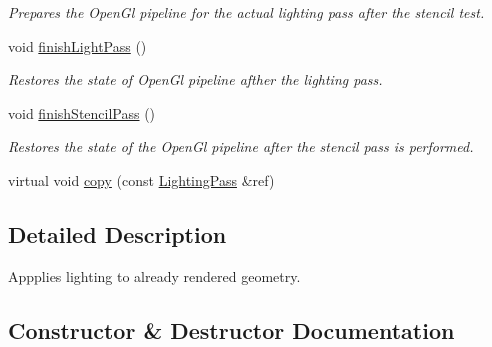 \begin{DoxyCompactItemize}
\begin{DoxyCompactList}\small\item\em Prepares the Open\+Gl pipeline for the actual lighting pass after the stencil test. \end{DoxyCompactList}\item 
\mbox{\label{class_geometry_engine_1_1_geometry_render_step_1_1_lighting_pass_a6d5e908865443b942b83362bf2d8a081}} 
void \mbox{\hyperlink{class_geometry_engine_1_1_geometry_render_step_1_1_lighting_pass_a6d5e908865443b942b83362bf2d8a081}{finish\+Light\+Pass}} ()
\begin{DoxyCompactList}\small\item\em Restores the state of Open\+Gl pipeline afther the lighting pass. \end{DoxyCompactList}\item 
\mbox{\label{class_geometry_engine_1_1_geometry_render_step_1_1_lighting_pass_aa809dc069c363993224df44cf44842bb}} 
void \mbox{\hyperlink{class_geometry_engine_1_1_geometry_render_step_1_1_lighting_pass_aa809dc069c363993224df44cf44842bb}{finish\+Stencil\+Pass}} ()
\begin{DoxyCompactList}\small\item\em Restores the state of the Open\+Gl pipeline after the stencil pass is performed. \end{DoxyCompactList}\item 
virtual void \mbox{\hyperlink{class_geometry_engine_1_1_geometry_render_step_1_1_lighting_pass_a4865616b03a872033a6f9abc5c370374}{copy}} (const \mbox{\hyperlink{class_geometry_engine_1_1_geometry_render_step_1_1_lighting_pass}{Lighting\+Pass}} \&ref)
\end{DoxyCompactItemize}


\subsection{Detailed Description}
Appplies lighting to already rendered geometry. 

\subsection{Constructor \& Destructor Documentation}
\mbox{\label{class_geometry_engine_1_1_geometry_render_step_1_1_lighting_pass_ab25f4db452340113c3ace2ab6994bd9f}} 
